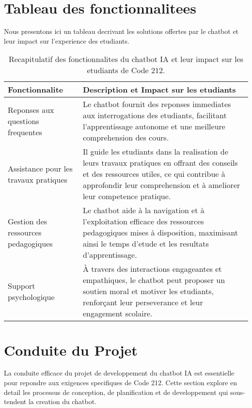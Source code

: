 \section{Tableau des fonctionnalitees}
Nous presentons ici un tableau decrivant les solutions offertes par le chatbot et leur impact sur l'experience des etudiants.


\begin{table}[h!]
\centering
\begin{tabular}{|p{6cm}|p{10cm}|}
\hline
\textbf{Fonctionnalite} & \textbf{Description et Impact sur les etudiants} \\ \hline
Reponses aux questions frequentes & Le chatbot fournit des reponses immediates aux interrogations des etudiants, facilitant l'apprentissage autonome et une meilleure comprehension des cours. \\ \hline
Assistance pour les travaux pratiques & Il guide les etudiants dans la realisation de leurs travaux pratiques en offrant des conseils et des ressources utiles, ce qui contribue à approfondir leur comprehension et à ameliorer leur competence pratique. \\ \hline
Gestion des ressources pedagogiques & Le chatbot aide à la navigation et à l'exploitation efficace des ressources pedagogiques mises à disposition, maximisant ainsi le temps d'etude et les resultats d'apprentissage. \\ \hline
Support psychologique & À travers des interactions engageantes et empathiques, le chatbot peut proposer un soutien moral et motiver les etudiants, renforçant leur perseverance et leur engagement scolaire. \\ \hline
\end{tabular}
\caption{Recapitulatif des fonctionnalites du chatbot IA et leur impact sur les etudiants de Code 212.}
\label{tab:chatbotfeatures}
\end{table}

\section{Conduite du Projet}
La conduite efficace du projet de developpement du chatbot IA est essentielle pour repondre aux exigences specifiques de Code 212. Cette section explore en detail les processus de conception, de planification et de developpement qui sous-tendent la creation du chatbot.

